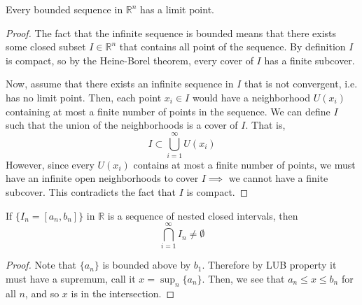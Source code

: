   \begin{theorem}
    Every bounded sequence in $\mathbb{R}^n$ has a limit point. 
  \end{theorem}
  \begin{proof}
    The fact that the infinite sequence is bounded means that there exists some closed subset $I \in \mathbb{R}^n$ that contains all point of the sequence. By definition $I$ is compact, so by the Heine-Borel theorem, every cover of $I$ has a finite subcover. 

    Now, assume that there exists an infinite sequence in $I$ that is not convergent, i.e. has no limit point. Then, each point $x_i \in I$ would have a neighborhood $U(x_i)$ containing at most a finite number of points in the sequence. We can define $I$ such that the union of the neighborhoods is a cover of $I$. That is, 
    \[I \subset \bigcup_{i=1}^\infty U(x_i)\]
    However, since every $U(x_i)$ contains at most a finite number of points, we must have an infinite open neighborhoods to cover $I \implies$ we cannot have a finite subcover. This contradicts the fact that $I$ is compact. 
  \end{proof}

  \begin{theorem}
    If $\{I_n = [a_n, b_n]\}$ in $\mathbb{R}$ is a sequence of nested closed intervals, then 
    \begin{equation}
      \bigcap_{i=1}^\infty I_n \neq \emptyset
    \end{equation}
  \end{theorem}
  \begin{proof}
    Note that $\{a_n\}$ is bounded above by $b_1$. Therefore by LUB property it must have a supremum, call it $x = \sup_n \{a_n\}$. Then, we see that $a_n \leq x \leq b_n$ for all $n$, and so $x$ is in the intersection. 
  \end{proof}

